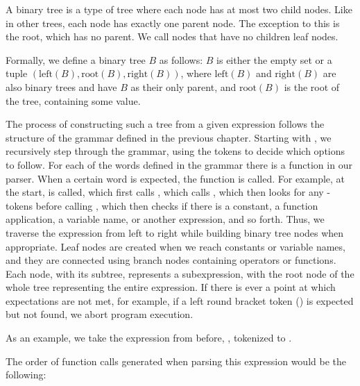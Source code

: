 \documentclass[12pt, a4paper]{report}
\begin{document}
A binary tree is a type of tree where each node has at most two child nodes.
Like in other trees, each node has exactly one parent node.
The exception to this is the root, which has no parent.
We call nodes that have no children leaf nodes.

Formally, we define a binary tree $B$ as follows:
$B$ is either the empty set or a tuple $(\text{left}(B),\text{root}(B),\text{right}(B))$, where $\text{left}(B)$ and $\text{right}(B)$ are also binary trees and have $B$ as their only parent, and $\text{root}(B)$ is the root of the tree, containing some value.

The process  of constructing such a tree from a given expression follows the structure of the grammar defined in the previous chapter.
Starting with , we recursively step through the grammar, using the tokens to decide which options to follow.
For each of the words defined in the grammar there is a function in our parser.
When a certain word is expected, the function is called.
For example, at the start,  is called, which first calls , which calls , which then looks for any -tokens before calling , which then checks if there is a constant, a function application, a variable name, or another expression, and so forth.
Thus, we traverse the expression from left to right while building binary tree nodes when appropriate.
Leaf nodes are created when we reach constants or variable names, and they are connected using branch nodes containing operators or functions.
Each node, with its subtree, represents a subexpression, with the root node of the whole tree representing the entire expression.
If there is ever a point at which expectations are not met, for example, if a left round bracket token () is expected but not found, we abort program execution.

As an example, we take the expression from before, , tokenized to .

The order of function calls generated when parsing this expression would be the following:
\end{document}

